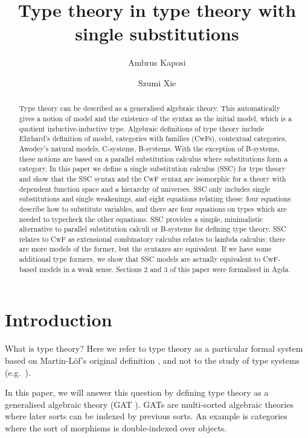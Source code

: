 \documentclass[a4paper,UKenglish,cleveref, autoref, thm-restate]{lipics-v2021}
\title{Type theory in type theory with single substitutions}
\author{Ambrus Kaposi}{Eötvös Loránd University (ELTE), Hungary}{akaposi@inf.elte.hu}{https://orcid.org/0000-0001-9897-8936}{}
\author{Szumi Xie}{Eötvös Loránd University (ELTE), Hungary}{szumi@inf.elte.hu}{https://orcid.org/0009-0001-1355-1114}{}
\begin{document}
\maketitle

\newtheorem{problem}[theorem]{Problem}
\theoremstyle{remark}
\newtheorem{construction}[theorem]{Construction}

\begin{abstract}
Type theory can be described as a generalised algebraic theory. This
automatically gives a notion of model and the existence of the syntax
as the initial model, which is a quotient inductive-inductive
type. Algebraic definitions of type theory include Ehrhard's
definition of model, categories with families (CwFs), contextual
categories, Awodey's natural models, C-systems, B-systems. With the
exception of B-systems, these notions are based on a parallel
substitution calculus where substitutions form a category. In this
paper we define a single substitution calculus (SSC) for type theory
and show that the SSC syntax and the CwF syntax are isomorphic for a
theory with dependent function space and a hierarchy of universes. SSC
only includes single substitutions and single weakenings, and eight
equations relating these: four equations describe how to substitute
variables, and there are four equations on types which are needed to
typecheck the other equations. SSC provides a simple, minimalistic
alternative to parallel substitution calculi or B-systems for defining
type theory. SSC relates to CwF as extensional combinatory calculus
relates to lambda calculus: there are more models of the former, but
the syntaxes are equivalent. If we have some additional type formers,
we show that SSC models are actually equivalent to CwF-based models in
a weak sense. Sections 2 and 3 of this paper were formalised in Agda.
\end{abstract}

\section{Introduction}

What is type theory? Here we refer to type theory as a particular
formal system based on Martin-Löf's original definition
\cite{martinlof73predicative}, and not to the study of type systems
(e.g.\ \cite{DBLP:books/daglib/0005958}).

In this paper, we will answer this question by defining type theory as
a generalised algebraic theory (GAT
\cite{DBLP:journals/apal/Cartmell86}). GATs are multi-sorted algebraic
theories where later sorts can be indexed by previous sorts. An
example is categories where the sort of morphisms is double-indexed
over objects.
\end{document}
